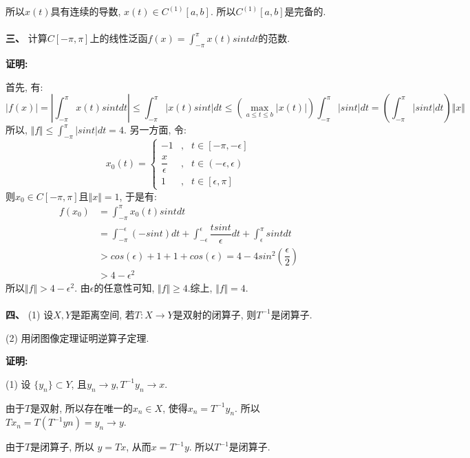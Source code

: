 \documentclass{article}
\begin{document}
所以$x(t)$具有连续的导数, $x(t) \in C^{(1)}[a,b]$. 所以$C^{(1)}[a,b]$是完备的.  \\  \\



\textbf{三、} 计算$C[-\pi, \pi]$上的线性泛函$f(x) = \int_{-\pi}^{\pi}x(t)sintdt$的范数. 

\textbf{证明:}

首先, 有:
$$ |f(x)| = |\int_{-\pi}^{\pi} x(t)sint dt| \leq \int_{-\pi}^{\pi} |x(t)sint|dt \leq (\max\limits_{a \leq t \leq b} |x(t)|) \int_{-\pi}^{\pi} |sint|dt = (\int_{-\pi}^{\pi} |sint|dt) \Vert x \Vert$$
所以, $\Vert f \Vert \leq \int_{-\pi}^{\pi} |sint|dt = 4 $. 另一方面, 令:
$$x_0(t) = \left\{
\begin{array}{lcl}
-1  &, & t \in [-\pi, -\epsilon] \\
\dfrac{x}{\epsilon} &, & t \in (-\epsilon, \epsilon) \\
1   &, & t \in [\epsilon, \pi]
\end{array} \right.
$$
则$x_0 \in C[-\pi, \pi]$且$\Vert x \Vert = 1$, 于是有:
\begin{align*}
f(x_0) &= \int_{-\pi}^{\pi} x_0(t)sintdt \\
       &= \int_{-\pi}^{-\epsilon} (-sint)dt + \int_{-\epsilon}^{\epsilon} \dfrac{tsint}{\epsilon} dt + \int_{\epsilon}^{\pi} sintdt  \\
       &> cos(\epsilon)+1 + 1 + cos(\epsilon)= 4-4sin^2(\dfrac{\epsilon}{2}) \\
       &> 4-\epsilon^2
\end{align*}
所以$\Vert f \Vert > 4 - \epsilon^2$. 由$\epsilon$的任意性可知, $\Vert f \Vert \geq 4$.综上, $\Vert f \Vert = 4$. \\  \\

\textbf{四、} (1) 设$X, Y$是距离空间, 若$T: X \rightarrow Y$是双射的闭算子, 则$T^{-1}$是闭算子. 

\hspace{2em} (2) 用闭图像定理证明逆算子定理.   

\textbf{证明:} 

(1) 设 $\{y_n \} \subset Y$, 且$y_n \rightarrow y, T^{-1}y_n \rightarrow x$. 

\hspace{1.5em} 由于$T$是双射, 所以存在唯一的$x_n \in X$, 使得$x_n = T^{-1}y_n$. 所以$Tx_n = T(T^{-1}yn) = y_n \rightarrow y$.

\hspace{1.5em} 由于$T$是闭算子, 所以 $y = Tx$, 从而$x = T^{-1}y$. 所以$T^{-1}$是闭算子. \\
\end{document}
